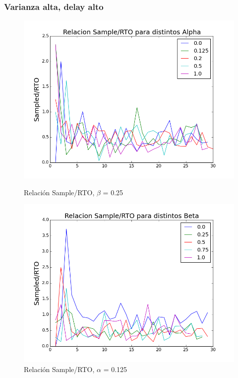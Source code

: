 \subsubsection{Varianza alta, delay alto}

\begin{figure}[H]
\begin{minipage}{0.5\linewidth}
\includegraphics[width=\linewidth]{../graficos/alphad025var5drop50.png}
\caption{Relación Sample/RTO, $\beta$ = 0.25}\label{fig:alpha-var5-drop50-alto}
\end{minipage}
\hfill
\begin{minipage}{0.5\linewidth}
\includegraphics[width=\linewidth]{../graficos/betad025var5drop50.png}
\caption{Relación Sample/RTO, $\alpha$ = 0.125}\label{fig:beta-var5-drop50-alto}
\end{minipage}
\end{figure}